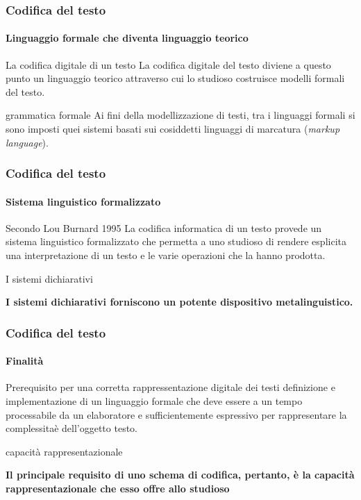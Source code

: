 \begin{frame}
	\frametitle{Codifica del testo}
	\framesubtitle{Linguaggio formale che diventa linguaggio teorico}
	\addtocounter{nframe}{1}

	\begin{block}{La codifica digitale di un testo}
		La codifica digitale del testo diviene a questo punto un linguaggio teorico attraverso cui lo studioso costruisce modelli formali del testo.
	\end{block}

	\begin{block}{grammatica formale}
		Ai fini della modellizzazione di testi, tra i linguaggi formali si sono imposti quei sistemi basati sui cosiddetti linguaggi di marcatura (\textit{markup language}).
	\end{block}
\end{frame}


\begin{frame}
	\frametitle{Codifica del testo}
	\framesubtitle{Sistema linguistico formalizzato}
	\addtocounter{nframe}{1}

	\begin{block}{Secondo Lou Burnard 1995}
		La codifica informatica di un testo provede un sistema linguistico formalizzato che permetta a uno studioso di rendere esplicita una interpretazione di un testo e le varie operazioni che la hanno prodotta.
	\end{block}

	\begin{block}{I sistemi dichiarativi}
		\begin{center}
			\textbf{I sistemi dichiarativi forniscono un potente dispositivo metalinguistico.}
		\end{center}
	\end{block}

\end{frame}

\begin{frame}
	\frametitle{Codifica del testo}
	\framesubtitle{Finalità}
	\addtocounter{nframe}{1}

	\begin{block}{Prerequisito per una corretta rappressentazione digitale dei testi}
		definizione e implementazione di un linguaggio formale che deve essere a un tempo processabile da un elaboratore e sufficientemente espressivo per rappresentare la complessitaè dell’oggetto testo.
	\end{block}

	\begin{block}{capacità rappresentazionale}
		\begin{center}
			\textbf{Il principale requisito di uno schema di codifica, pertanto, è la capacità rappresentazionale che esso offre allo studioso}
		\end{center}
	\end{block}

\end{frame}

